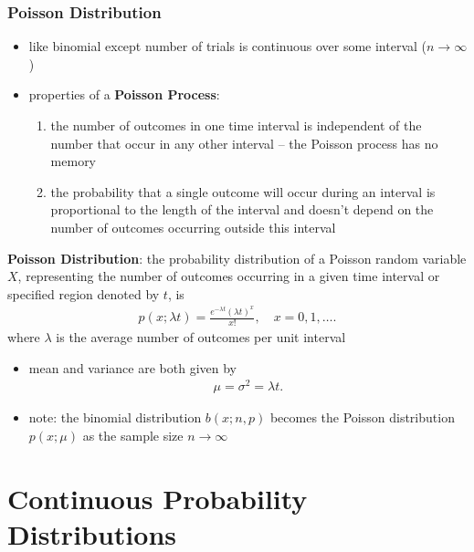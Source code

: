 \documentclass[10pt]{article}
\begin{document}
\section{Poisson Distribution}
\begin{itemize}
    \item like binomial except number of trials is continuous over some interval ($n \to \infty$)
    \item properties of a \textbf{Poisson Process}:
        \begin{enumerate}
            \item the number of outcomes in one time interval is independent of the number that occur in any other interval -- the Poisson process has no memory 
            \item the probability that a single outcome will occur during an interval is proportional to the length of the interval and doesn't depend on the number of outcomes occurring outside this interval
        \end{enumerate}
\end{itemize}
\begin{definition}
    \textbf{Poisson Distribution}: the probability distribution of a Poisson random variable $X$, representing the number of outcomes occurring in a given time interval or specified region denoted by $t$, is 
    \begin{gather*}
        p(x; \lambda t) = \frac{e^{-\lambda t}(\lambda t)^x}{x!}, \quad x = 0, 1, \ldots
    .\end{gather*}
    where $\lambda$ is the average number of outcomes per unit interval
    \begin{itemize}
        \item mean and variance are both given by 
            \begin{gather*}
                \mu = \sigma^2 = \lambda t
            .\end{gather*}
        \item note: the binomial distribution $b(x;n,p)$ becomes the Poisson distribution $p(x;\mu)$ as the sample size $n \to \infty$
    \end{itemize}
\end{definition}



\newpage
\part{Continuous Probability Distributions}
\end{document}
